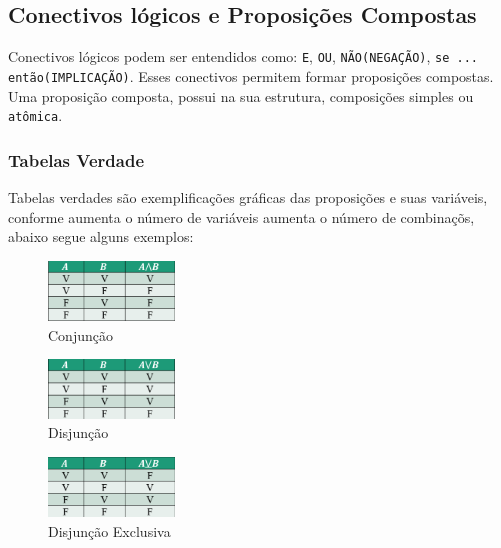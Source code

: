 \documentclass[12pt, onecolumn]{article}
\begin{document}
		\subsection{Conectivos lógicos e Proposições Compostas}

	Conectivos lógicos podem ser entendidos como: \texttt{E}, \texttt{OU}, 
	\texttt{NÃO(NEGAÇÃO)}, \texttt{se ... então(IMPLICAÇÃO)}. Esses conectivos 
	permitem formar proposições compostas. \\
	\newline
	Uma proposição composta, possui na sua estrutura, composições simples ou 
	\texttt{atômica}. \\
	\newline
	\subsubsection{\centering Tabelas Verdade}
	Tabelas verdades são exemplificações gráficas das proposições e suas
	variáveis, conforme aumenta o número de variáveis aumenta o 
	número de combinaçõs, abaixo segue alguns exemplos: \\
	\begin{figure}[h]
		\centering
		\includegraphics[width=0.3\textwidth]{./imagens/tabela-verdade-E.png}
		\caption{Conjunção}
		\label{fig:tab-e}
	\end{figure}
	
	\begin{figure}[h]
		\centering
		\includegraphics[width=0.3\textwidth]{./imagens/tabela-verdade-OU.png}
		\caption{Disjunção}
		\label{fig:tab-ou}
	\end{figure}

	\begin{figure}[h]
		\centering
		\includegraphics[width=0.3\textwidth]{./imagens/tabela-verdade-OUex.png}
		\caption{Disjunção Exclusiva}
		\label{fig:tab-ouex}
	\end{figure}
\end{document}
